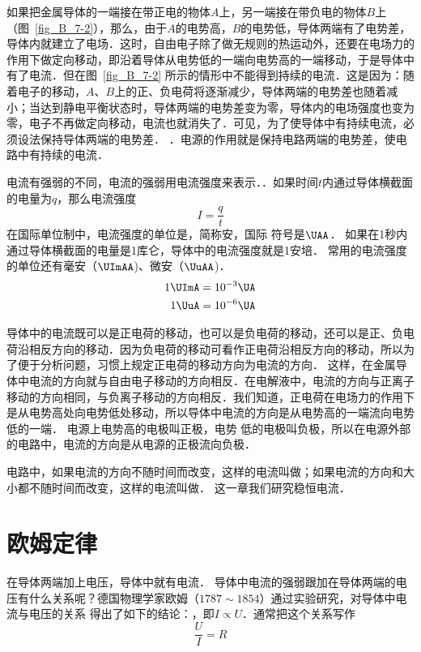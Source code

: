如果把金属导体的一端接在带正电的物体$A$上，另一端接在带负电的物体$B$上（图~\ref{fig_B_7-2}），那么，由于$A$的电势高，$B$的电势低，导体两端有了电势差，导体内就建立了电场．这时，自由电子除了做无规则的热运动外，还要在电场力的作用下做定向移动，即沿着导体从电势低的一端向电势高的一端移动，于是导体中有了电流．但在图~\ref{fig_B_7-2} 所示的情形中不能得到持续的电流．这是因为：随着电子的移动，$A$、$B$上的正、负电荷将逐渐减少，导体两端的电势差也随着减小；当达到静电平衡状态时，导体两端的电势差变为零，导体内的电场强度也变为零，电子不再做定向移动，电流也就消失了．可见，为了使导体中有持续电流，必须设法保持导体两端的电势差．
．电源的作用就是保持电路两端的电势差，使电路中有持续的电流．



电流有强弱的不同，电流的强弱用电流强度来表示．．如果时间$t$内通过导体横截面的电量为$q$，那么电流强度
\[I=\frac{q}{t} \]
在国际单位制中，电流强度的单位是，简称安，国际
符号是$\UAA$．
如果在1秒内通过导体横截面的电量是1库仑，导体中的电流强度就是1安培．
常用的电流强度的单位还有毫安（$\UImAA$)、微安（$\UuAA$)．
\[\begin{split}
    1 \UImA &= 10^{-3} \UA\\
    1 \UuA &=10^{-6} \UA
\end{split}\]

导体中的电流既可以是正电荷的移动，也可以是负电荷的移动，还可以是正、负电荷沿相反方向的移动．因为负电荷的移动可看作正电荷沿相反方向的移动，所以为了便于分析问题，习惯上规定正电荷的移动方向为电流的方向．
这样，在金属导体中电流的方向就与自由电子移动的方向相反．在电解液中，电流的方向与正离子移动的方向相同，与负离子移动的方向相反．我们知道，正电荷在电场力的作用下是从电势高处向电势低处移动，所以导体中电流的方向是从电势高的一端流向电势低的一端．
电源上电势高的电极叫正极，电势
低的电极叫负极，所以在电源外部的电路中，电流的方向是从电源的正极流向负极．

电路中，如果电流的方向不随时间而改变，这样的电流叫做；如果电流的方向和大小都不随时间而改变，这样的电流叫做．
这一章我们研究稳恒电流．

\section{欧姆定律}
在导体两端加上电压，导体中就有电流．
导体中电流的强弱跟加在导体两端的电压有什么关系呢？德国物理学家欧姆（$1787 \sim 1854$）通过实验研究，对导体中电流与电压的关系
得出了如下的结论：，即$I\propto U$．通常把这个关系写作
\[\frac{U}{I}=R\]

